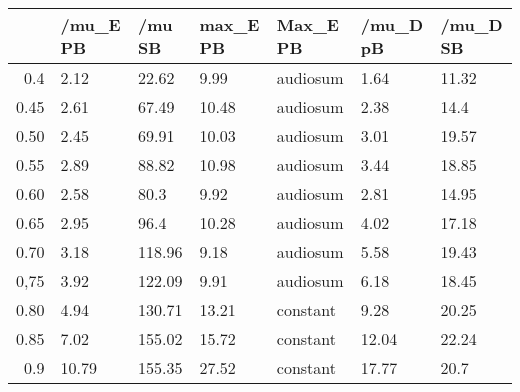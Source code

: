 \begin{table}[ht]
\centering
\begin{tabular}{rllllll}
  \hline
 & /mu\_E PB & /mu SB & max\_E PB & Max\_E PB & /mu\_D pB & /mu\_D SB \\ 
  \hline
0.4 & 2.12 & 22.62 & 9.99 & audiosum & 1.64 & 11.32 \\ 
  0.45 & 2.61 & 67.49 & 10.48 & audiosum & 2.38 & 14.4 \\ 
  0.50 & 2.45 & 69.91 & 10.03 & audiosum & 3.01 & 19.57 \\ 
  0.55 & 2.89 & 88.82 & 10.98 & audiosum & 3.44 & 18.85 \\ 
  0.60 & 2.58 & 80.3 & 9.92 & audiosum & 2.81 & 14.95 \\ 
  0.65 & 2.95 & 96.4 & 10.28 & audiosum & 4.02 & 17.18 \\ 
  0.70 & 3.18 & 118.96 & 9.18 & audiosum & 5.58 & 19.43 \\ 
  0,75 & 3.92 & 122.09 & 9.91 & audiosum & 6.18 & 18.45 \\ 
  0.80 & 4.94 & 130.71 & 13.21 & constant & 9.28 & 20.25 \\ 
  0.85 & 7.02 & 155.02 & 15.72 & constant & 12.04 & 22.24 \\ 
  0.9 & 10.79 & 155.35 & 27.52 & constant & 17.77 & 20.7 \\ 
   \hline
\end{tabular}
\end{table}
